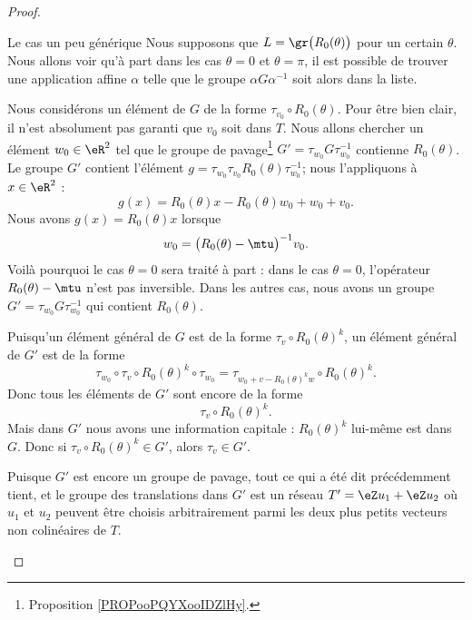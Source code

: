 \begin{proof}
\begin{subproof}
		\item[Le cas un peu générique]
		Nous supposons que \( L=\gr\big( R_0(\theta) \big)\) pour un certain \( \theta\). Nous allons voir qu'à part dans les cas \( \theta=0\) et \( \theta=\pi\), il est possible de trouver une application affine \( \alpha\) telle que le groupe \( \alpha G\alpha^{-1}\) soit alors dans la liste.

		Nous considérons un élément de \( G\) de la forme \( \tau_{v_0}\circ R_0(\theta)\). Pour être bien clair, il n'est absolument pas garanti que \( v_0\) soit dans \( T\). Nous allons chercher un élément \( w_0\in \eR^2\) tel que le groupe de pavage\footnote{Proposition \ref{PROPooPQYXooIDZlHy}.} \( G'=\tau_{w_0}G\tau_{w_0}^{-1}\) contienne \( R_0(\theta)\). Le groupe \( G'\) contient l'élément \( g=\tau_{w_0}\tau_{v_0}R_0(\theta)\tau_{w_0}^{-1}\); nous l'appliquons à \( x\in \eR^2\) :
		\begin{equation}
			g(x)=R_0(\theta)x-R_0(\theta)w_0+w_0+v_0.
		\end{equation}
		Nous avons \( g(x)=R_0(\theta)x\) lorsque
		\begin{equation}
			w_0=\big( R_0(\theta)-\mtu \big)^{-1}v_0.
		\end{equation}
		Voilà pourquoi le cas \( \theta=0\) sera traité à part : dans le cas \( \theta=0\), l'opérateur \( R_0(\theta)-\mtu\) n'est pas inversible. Dans les autres cas, nous avons un groupe \( G'=\tau_{w_0}G\tau_{w_0}^{-1}\) qui contient \( R_0(\theta)\).

		Puisqu'un élément général de \( G\) est de la forme \( \tau_v\circ R_0(\theta)^k\), un élément général de \( G' \) est de la forme
		\begin{equation}
			\tau_{w_0}\circ \tau_v\circ R_0(\theta)^k\circ \tau_{w_0}=\tau_{w_0+v-R_0(\theta)^kw}\circ R_0(\theta)^k.
		\end{equation}
		Donc tous les éléments de \( G'\) sont encore de la forme
		\begin{equation}
			\tau_v\circ R_0(\theta)^k.
		\end{equation}
		Mais dans \( G'\) nous avons une information capitale : \( R_0(\theta)^k\) lui-même est dans \( G\). Donc si \( \tau_v\circ R_0(\theta)^k\in G'\), alors \( \tau_v\in G'\).

		Puisque \( G'\) est encore un groupe de pavage, tout ce qui a été dit précédemment tient, et le groupe des translations dans \( G'\) est un réseau \( T'=\eZ u_1+\eZ u_2\) où \( u_1\) et \( u_2\) peuvent être choisis arbitrairement parmi les deux plus petits vecteurs non colinéaires de \( T\).


\end{subproof}
\end{proof}

